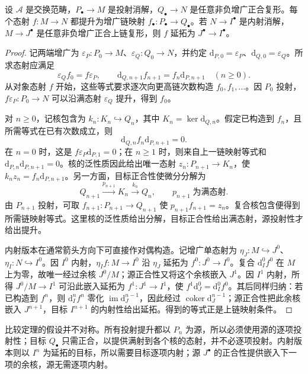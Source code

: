\begin{theorem}[比较定理]\label{b4:thm:resolution-comparison}
	设 \(\mathcal A\) 是交换范畴，\(P_\bullet\to M\) 是投射消解，\(Q_\bullet\to N\) 是任意非负增广正合复形。每个态射 \(f:M\to N\) 都提升为增广链映射 \(f_\bullet:P_\bullet\to Q_\bullet\)。若 \(N\to I^\bullet\) 是内射消解，\(M\to J^\bullet\) 是任意非负增广正合上链复形，则 \(f\) 延拓为 \(J^\bullet\to I^\bullet\)。
\end{theorem}
\begin{proof}
	记两端增广为 \(\varepsilon_P:P_0\to M\)、\(\varepsilon_Q:Q_0\to N\)，并约定 \(\mathrm{d}_{P,0}=\varepsilon_P\)、\(\mathrm{d}_{Q,0}=\varepsilon_Q\)。所求态射应满足
	\[
		\varepsilon_Qf_0=f\varepsilon_P, \qquad \mathrm{d}_{Q,n+1}f_{n+1}=f_n\mathrm{d}_{P,n+1} \quad(n\ge0).
	\]
	从对象态射 \(f\) 开始，这些等式要求逐次向更高链次数构造 \(f_0,f_1,\ldots\)。因 \(P_0\) 投射，\(f\varepsilon_P:P_0\to N\) 可以沿满态射 \(\varepsilon_Q\) 提升，得到 \(f_0\)。

	对 \(n\ge0\)，记核包含为 \(k_n:K_n\hookrightarrow Q_n\)，其中 \(K_n=\ker\mathrm{d}_{Q,n}\)。假定已构造到 \(f_n\)，且所需等式在已有次数成立，则
	\[
		\mathrm{d}_{Q,n}f_n\mathrm{d}_{P,n+1}=0.
	\]
	在 \(n=0\) 时，这是 \(f\varepsilon_P\mathrm{d}_{P,1}=0\)；在 \(n\ge1\) 时，则来自上一链映射等式和 \(\mathrm{d}_{P,n}\mathrm{d}_{P,n+1}=0\)。核的泛性质因此给出唯一态射 \(z_n:P_{n+1}\to K_n\)，使 \(k_nz_n=f_n\mathrm{d}_{P,n+1}\)。另一方面，目标正合性使微分分解为
	\[
		Q_{n+1}\xrightarrow{p_{n+1}}K_n\xrightarrow{k_n}Q_n, \qquad p_{n+1}\;\text{为满态射}.
	\]
	由 \(P_{n+1}\) 投射，可取 \(f_{n+1}:P_{n+1}\to Q_{n+1}\) 使 \(p_{n+1}f_{n+1}=z_n\)。复合核包含便得到所需链映射等式。这里核的泛性质给出分解，目标正合性给出满态射，源投射性才给出提升。

	内射版本在通常箭头方向下可直接作对偶构造。记增广单态射为 \(\eta_J:M\hookrightarrow J^0\)、\(\eta_I:N\hookrightarrow I^0\)。因 \(I^0\) 内射，\(\eta_If:M\to I^0\) 沿 \(\eta_J\) 延拓为 \(f^0:J^0\to I^0\)。复合 \(\mathrm{d}_I^0f^0\) 在 \(M\) 上为零，故唯一经过余核 \(J^0/M\)；源正合性又将这个余核嵌入 \(J^1\)。因 \(I^1\) 内射，所得 \(J^0/M\to I^1\) 可沿此嵌入延拓为 \(f^1:J^1\to I^1\)，使 \(f^1\mathrm{d}_J^0=\mathrm{d}_I^0f^0\)。其后同样归纳：若已构造到 \(f^n\)，则 \(\mathrm{d}_I^nf^n\) 零化 \(\operatorname{im}\mathrm{d}_J^{n-1}\)，因此经过 \(\operatorname{coker}\mathrm{d}_J^{n-1}\)；源正合性把此余核嵌入 \(J^{n+1}\)，目标 \(I^{n+1}\) 的内射性给出延拓。得到的等式正是上链映射条件。
\end{proof}

比较定理的假设并不对称。所有投射提升都以 \(P_n\) 为源，所以必须使用源的逐项投射性；目标 \(Q_\bullet\) 只需正合，以提供满射到各个核的态射，并不必逐项投射。内射版本则以 \(I^n\) 为延拓的目标，所以需要目标逐项内射；源 \(J^\bullet\) 的正合性提供嵌入下一项的余核，源无需逐项内射。

